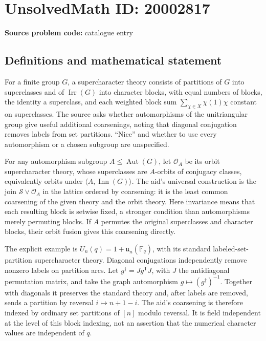 \documentclass[11pt]{article}
\newcommand{\F}{\mathbb{F}}
\begin{document}
\section*{UnsolvedMath ID: 20002817}
\textbf{Source problem code:} catalogue entry
\subsection{Definitions and mathematical statement}
For a finite group \(G\), a supercharacter theory consists of partitions of \(G\) into superclasses and of \(\operatorname{Irr}(G)\) into character blocks, with equal numbers of blocks, the identity a superclass, and each weighted block sum \(\sum_{\chi\in X}\chi(1)\chi\) constant on superclasses. The source asks whether automorphisms of the unitriangular group give useful additional coarsenings, noting that diagonal conjugation removes labels from set partitions. ``Nice'' and whether to use every automorphism or a chosen subgroup are unspecified.

For any automorphism subgroup \(A\le\operatorname{Aut}(G)\), let \(\mathcal O_A\) be its orbit supercharacter theory, whose superclasses are \(A\)-orbits of conjugacy classes, equivalently orbits under \(\langle A,\operatorname{Inn}(G)\rangle\). The aid's universal construction is the join \(\mathcal S\vee\mathcal O_A\) in the lattice ordered by coarsening: it is the least common coarsening of the given theory and the orbit theory. Here invariance means that each resulting block is setwise fixed, a stronger condition than automorphisms merely permuting blocks. If \(A\) permutes the original superclasses and character blocks, their orbit fusion gives this coarsening directly.

The explicit example is \(U_n(q)=1+\mathfrak u_n(\F_q)\), with its standard labeled-set-partition supercharacter theory. Diagonal conjugations independently remove nonzero labels on partition arcs. Let \(g^\dagger=Jg^{\mathsf T}J\), with \(J\) the antidiagonal permutation matrix, and take the graph automorphism \(g\mapsto(g^\dagger)^{-1}\). Together with diagonals it preserves the standard theory and, after labels are removed, sends a partition by reversal \(i\mapsto n+1-i\). The aid's coarsening is therefore indexed by ordinary set partitions of \([n]\) modulo reversal. It is field independent at the level of this block indexing, not an assertion that the numerical character values are independent of \(q\).
\end{document}
